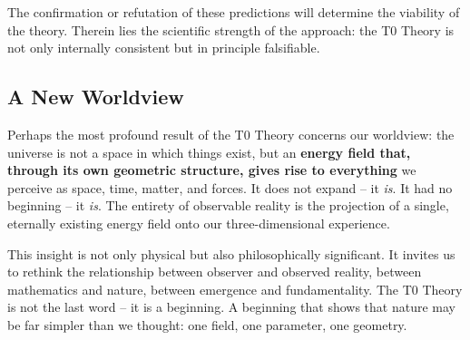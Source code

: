 \documentclass[11pt,openright,twoside]{book}
\begin{document}
The confirmation or refutation of these predictions will determine the viability of the theory. Therein lies the scientific strength of the approach: the T0 Theory is not only internally consistent but in principle falsifiable.

\subsection*{A New Worldview}

Perhaps the most profound result of the T0 Theory concerns our worldview: the universe is not a space in which things exist, but an \textbf{energy field that, through its own geometric structure, gives rise to everything} we perceive as space, time, matter, and forces. It does not expand -- it \textit{is}. It had no beginning -- it \textit{is}. The entirety of observable reality is the projection of a single, eternally existing energy field onto our three-dimensional experience.

This insight is not only physical but also philosophically significant. It invites us to rethink the relationship between observer and observed reality, between mathematics and nature, between emergence and fundamentality. The T0 Theory is not the last word -- it is a beginning. A beginning that shows that nature may be far simpler than we thought: one field, one parameter, one geometry.
\end{document}
